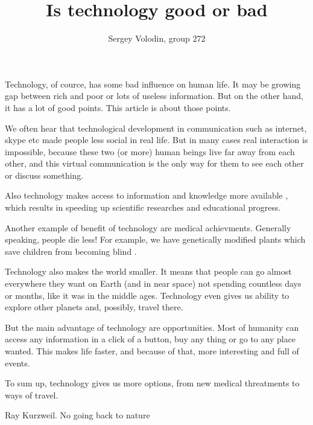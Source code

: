 \documentclass[a4paper]{article}
\author{Sergey Volodin, group 272}
\title{Is technology good or bad}
\begin{document}
\maketitle
Technology, of cource, has some bad influence on human life. It may be growing gap between rich and poor or lots of useless information. But on the other hand, it has a lot of good points. This article is about those points.

We often hear that technological development in communication such as internet, skype etc made people less social in real life. But in many cases real interaction is impossible, because these two (or more) human beings live far away from each other, and this virtual communication is the only way for them to see each other or discuss something.

Also technology makes access to information and knowledge more available \cite{test1}, which results in speeding up scientific researches and educational progress.

Another example of benefit of technology are medical achievments. Generally speaking, people die less! For example, we have genetically modified plants which save children from becoming blind \cite{test1}.

Technology also makes the world smaller. It means that people can go almost everywhere they want on Earth (and in near space) not spending countless days or months, like it was in the middle ages. Technology even gives us ability to explore other planets and, possibly, travel there.

But the main advantage of technology are opportunities. Most of humanity can access any information in a click of a button, buy any thing or go to any place wanted. This makes life faster, and because of that, more interesting and full of events.

To sum up, technology gives us more options, from new medical threatments to ways of travel.
\begin{thebibliography}{widestlabel}
 Ray Kurzweil. No going back to nature
\end{thebibliography}
\end{document}
